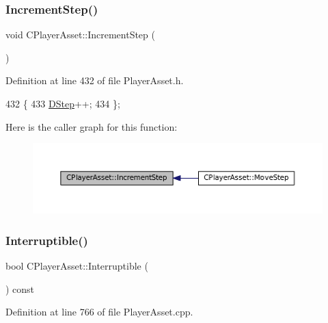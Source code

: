\subsubsection{\texorpdfstring{Increment\+Step()}{IncrementStep()}}
{\footnotesize\ttfamily void C\+Player\+Asset\+::\+Increment\+Step (\begin{DoxyParamCaption}{ }\end{DoxyParamCaption})\hspace{0.3cm}{\ttfamily [inline]}}



Definition at line 432 of file Player\+Asset.\+h.


\begin{DoxyCode}
432                             \{
433             \hyperlink{classCPlayerAsset_a7964d2161d51b3edd66fbc9c59eba4b0}{DStep}++;    
434         \};
\end{DoxyCode}
Here is the caller graph for this function\+:\nopagebreak
\begin{figure}[H]
\begin{center}
\leavevmode
\includegraphics[width=350pt]{classCPlayerAsset_aa1d39b408fd5aa11f2c3a19ef4d3895d_icgraph}
\end{center}
\end{figure}
\hypertarget{classCPlayerAsset_a927a79955847918fa2807d37374b4fb6}{}\label{classCPlayerAsset_a927a79955847918fa2807d37374b4fb6} 
\subsubsection{\texorpdfstring{Interruptible()}{Interruptible()}}
{\footnotesize\ttfamily bool C\+Player\+Asset\+::\+Interruptible (\begin{DoxyParamCaption}{ }\end{DoxyParamCaption}) const}



Definition at line 766 of file Player\+Asset.\+cpp.


